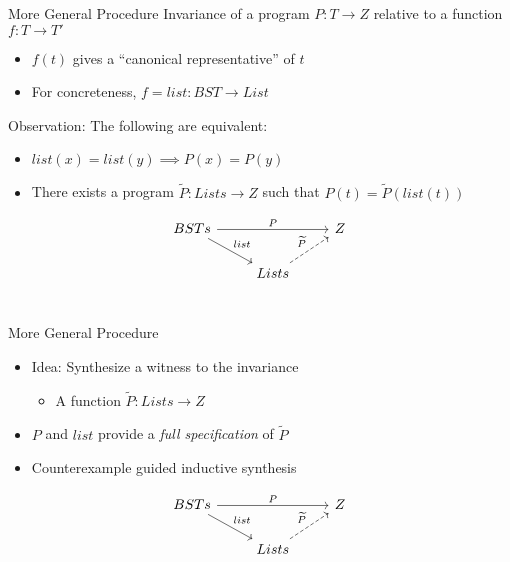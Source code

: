 \documentclass[usenames,dvipsnames]{beamer}
\begin{document}
\begin{frame}[fragile]{More General Procedure}
  Invariance of a program $P : T\to Z$
  relative to a function $f : T \to T'$
  \begin{itemize}
    \item $f(t)$ gives a ``canonical representative'' of $t$
    \item For concreteness, $f = list : BST \to List$
  \end{itemize}
  \vfill
  Observation:
  The following are equivalent:
  \begin{itemize}
    \item $list(x) = list(y) \implies P(x) = P(y)$
    \item There exists a program $\widetilde{P} : Lists\to Z$
      such that $P(t) = \widetilde{P}(list(t))$
  \end{itemize}

  \[
    \begin{tikzcd}
      BSTs \arrow{rr}{P} \arrow{rd}{list} &   & Z \\
      & Lists \arrow[dashed]{ru}{\widetilde{P}} &   \\
    \end{tikzcd}
  \]
\end{frame}

\begin{frame}[fragile]{More General Procedure}
  \begin{itemize}
    \item Idea: Synthesize a witness to the invariance
    \begin{itemize}
      \item A function $\widetilde{P} : Lists \to Z$
    \end{itemize}
    \item $P$ and $list$ provide a \emph{full specification} of $\widetilde{P}$
    \item Counterexample guided inductive synthesis
  \end{itemize}

  \[
    \begin{tikzcd}
      BSTs \arrow{rr}{P} \arrow{rd}{list} &   & Z \\
      & Lists \arrow[dashed]{ru}{\widetilde{P}} &   \\
    \end{tikzcd}
  \]
\end{frame}
\end{document}
